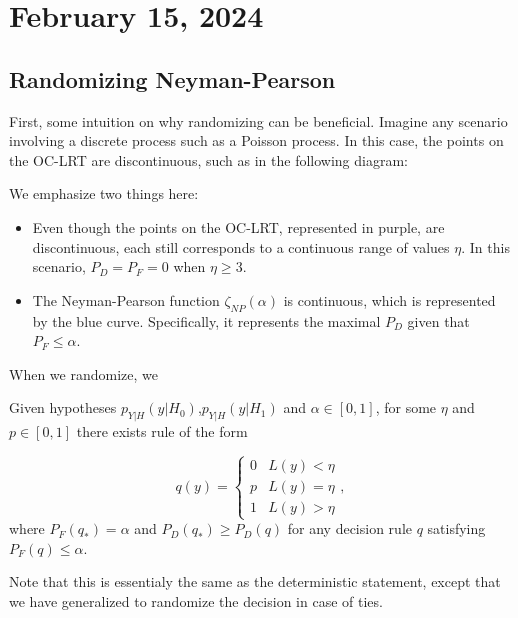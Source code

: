 \section{February 15, 2024}

\subsection{Randomizing Neyman-Pearson}

First, some intuition on why randomizing can be beneficial. Imagine any scenario involving a discrete process such as a Poisson process. In this case, the points on the OC-LRT are discontinuous, such as in the following diagram: 



\noindent We emphasize two things here:
\begin{itemize}
	\item Even though the points on the OC-LRT, represented in purple, are discontinuous, each still corresponds to a continuous range of values $\eta$. In this scenario, $P_D = P_F = 0$ when $\eta\geq 3$.  
	\item The Neyman-Pearson function $\zeta_{NP}(\alpha)$ is continuous, which is represented by the blue curve. Specifically, it represents the maximal $P_D$ given that $P_F\leq \alpha$.  
\end{itemize}

When we randomize, we 



\begin{theorem}

Given hypotheses $p_{Y|H}(y|H_0)$,$p_{Y|H}(y|H_1)$ and $\alpha\in [0,1]$, for some $\eta$ and $p\in [0,1]$ there exists rule of the form 

\[
q(y) = \begin{cases}
	0 & L(y) < \eta \\
	p & L(y) = \eta \\
	1 & L(y) > \eta
\end{cases},
\] 
where $P_F(q_*) = \alpha$ and $P_D(q_*)\geq P_D(q)$ for any decision rule $q$ satisfying $P_F(q)\leq \alpha$.
\end{theorem}
Note that this is essentialy the same as the deterministic statement, except that we have generalized to randomize the decision in case of ties. 


